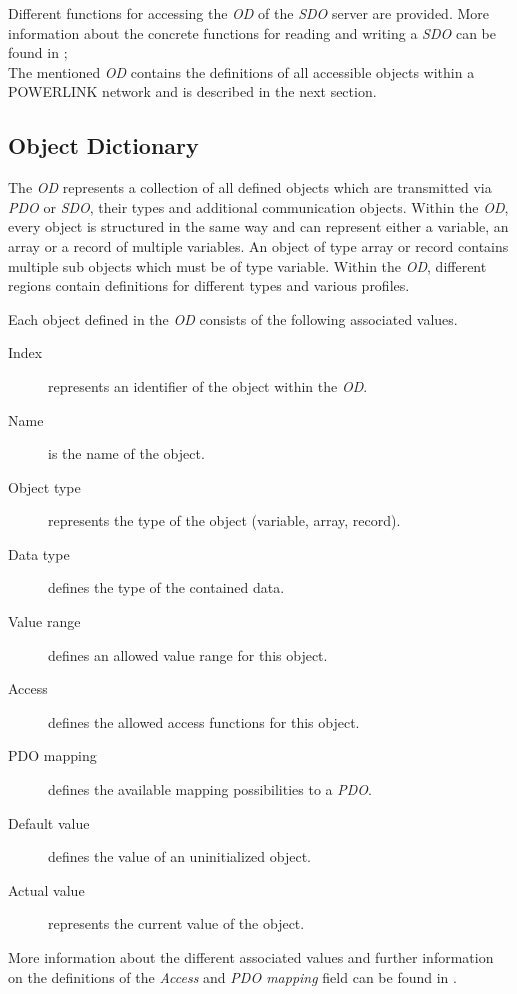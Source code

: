Different functions for accessing the \emph{OD} of the \emph{SDO} server are provided.
More information about the concrete functions for reading and writing a \emph{SDO} can be found in \cite[section 6.3.2.4.2]{epsg_epsg_2013};
\\

The mentioned \emph{OD} contains the definitions of all accessible objects within a POWERLINK network and is described in the next section.

\subsection{Object Dictionary}
\label{sec:oplk_powerlink_object_dictionary}
The \emph{OD} represents a collection of all defined objects which are transmitted via \emph{PDO} or \emph{SDO}, their types and additional communication objects.
Within the \emph{OD}, every object is structured in the same way and can represent either a variable, an array or a record of multiple variables.
An object of type array or record contains multiple sub objects which must be of type variable.
Within the \emph{OD}, different regions contain definitions for different types and various profiles. \cite[section 2.2.2]{epsg_epsg_2013}

Each object defined in the \emph{OD} consists of the following associated values.

\begin{description}
    \item[Index] represents an identifier of the object within the \emph{OD}.
    \item[Name] is the name of the object.
    \item[Object type] represents the type of the object (variable, array, record).
    \item[Data type] defines the type of the contained data.
    \item[Value range] defines an allowed value range for this object.
    \item[Access] defines the allowed access functions for this object.
    \item[PDO mapping] defines the available mapping possibilities to a \emph{PDO}.
    \item[Default value] defines the value of an uninitialized object.
    \item[Actual value] represents the current value of the object.
\end{description}

More information about the different associated values and further information on the definitions of the \emph{Access} and \emph{PDO mapping} field can be found in \cite{openpowerlink_od_object}.

